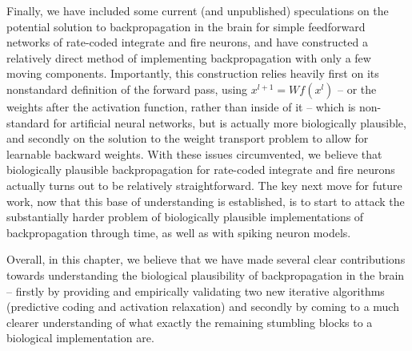 Finally, we have included some current (and unpublished) speculations on the potential solution to backpropagation in the brain for simple feedforward networks of rate-coded integrate and fire neurons, and have constructed a relatively direct method of implementing backpropagation with only a few moving components. Importantly, this construction relies heavily first on its nonstandard definition of the forward pass, using $x^{l+1} = W f(x^l)$  -- or the weights after the activation function, rather than inside of it -- which is non-standard for artificial neural networks, but is actually more biologically plausible, and secondly on the solution to the weight transport problem to allow for learnable backward weights. With these issues circumvented, we believe that biologically plausible backpropagation for rate-coded integrate and fire neurons actually turns out to be relatively straightforward. The key next move for future work, now that this base of understanding is established, is to start to attack the substantially harder problem of biologically plausible implementations of backpropagation through time, as well as with spiking neuron models.

Overall, in this chapter, we believe that we have made several clear contributions towards understanding the biological plausibility of backpropagation in the brain -- firstly by providing and empirically validating two new iterative algorithms (predictive coding and activation relaxation) and secondly by coming to a much clearer understanding of what exactly the remaining stumbling blocks to a biological implementation are.
